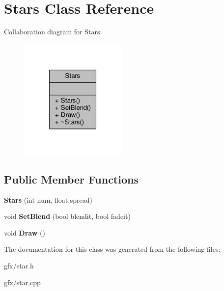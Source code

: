 \hypertarget{classStars}{}\section{Stars Class Reference}
\label{classStars}


Collaboration diagram for Stars\+:
\nopagebreak
\begin{figure}[H]
\begin{center}
\leavevmode
\includegraphics[width=151pt]{d3/d57/classStars__coll__graph}
\end{center}
\end{figure}
\subsection*{Public Member Functions}
\begin{DoxyCompactItemize}
\item 
{\bfseries Stars} (int num, float spread)\hypertarget{classStars_a9e15b511607baf616491873b43740dcc}{}\label{classStars_a9e15b511607baf616491873b43740dcc}

\item 
void {\bfseries Set\+Blend} (bool blendit, bool fadeit)\hypertarget{classStars_afcd23580b823f3f6dd9d92a2705db986}{}\label{classStars_afcd23580b823f3f6dd9d92a2705db986}

\item 
void {\bfseries Draw} ()\hypertarget{classStars_a00d14b0515adc103531ac0c2c1b7950a}{}\label{classStars_a00d14b0515adc103531ac0c2c1b7950a}

\end{DoxyCompactItemize}


The documentation for this class was generated from the following files\+:\begin{DoxyCompactItemize}
\item 
gfx/star.\+h\item 
gfx/star.\+cpp\end{DoxyCompactItemize}
